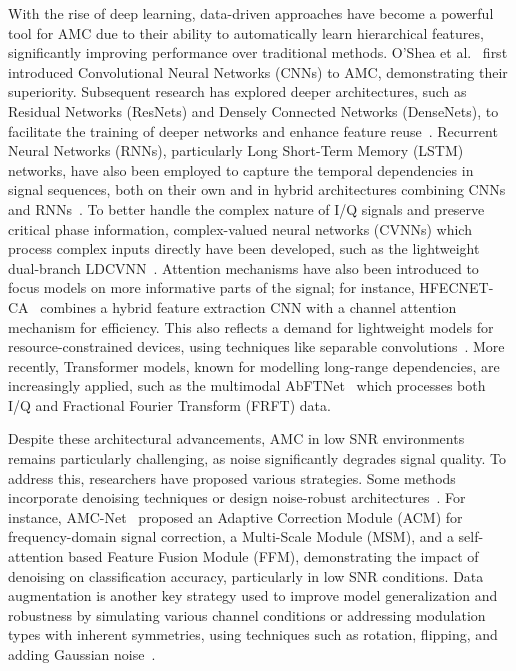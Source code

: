 \documentclass[conference]{IEEEtran}
\begin{document}
With the rise of deep learning, data-driven approaches have become a powerful tool for AMC due to their ability to automatically learn hierarchical features, significantly improving performance over traditional methods. O'Shea et al.~\cite{oshea2016convolutional} first introduced Convolutional Neural Networks (CNNs) to AMC, demonstrating their superiority. Subsequent research has explored deeper architectures, such as Residual Networks (ResNets) and Densely Connected Networks (DenseNets), to facilitate the training of deeper networks and enhance feature reuse~\cite{west2017deep, patil2021automatic}. Recurrent Neural Networks (RNNs), particularly Long Short-Term Memory (LSTM) networks, have also been employed to capture the temporal dependencies in signal sequences, both on their own and in hybrid architectures combining CNNs and RNNs~\cite{rajendran2018deep, xu2020spatiotemporal}. 
To better handle the complex nature of I/Q signals and preserve critical phase information, complex-valued neural networks (CVNNs) which process complex inputs directly have been developed, such as the lightweight dual-branch LDCVNN~\cite{xu2025ldcvnn}. Attention mechanisms have also been introduced to focus models on more informative parts of the signal; for instance, HFECNET-CA~\cite{ma2023hfecnetca} combines a hybrid feature extraction CNN with a channel attention mechanism for efficiency. This also reflects a demand for lightweight models for resource-constrained devices, using techniques like separable convolutions~\cite{guo2024ulcnn, ma2023hfecnetca, xu2025ldcvnn}. More recently, Transformer models, known for modelling long-range dependencies, are increasingly applied, such as the multimodal AbFTNet~\cite{ning2024abftnet} which processes both I/Q and Fractional Fourier Transform (FRFT) data.

Despite these architectural advancements, AMC in low SNR environments remains particularly challenging, as noise significantly degrades signal quality. To address this, researchers have proposed various strategies. Some methods incorporate denoising techniques or design noise-robust architectures~\cite{yao2019modulation}. For instance, AMC-Net~\cite{zhang2023amcnet} proposed an Adaptive Correction Module (ACM) for frequency-domain signal correction, a Multi-Scale Module (MSM), and a self-attention based Feature Fusion Module (FFM), demonstrating the impact of denoising on classification accuracy, particularly in low SNR conditions. Data augmentation is another key strategy used to improve model generalization and robustness by simulating various channel conditions or addressing modulation types with inherent symmetries, using techniques such as rotation, flipping, and adding Gaussian noise~\cite{zhang2023efficient}.
\end{document}
